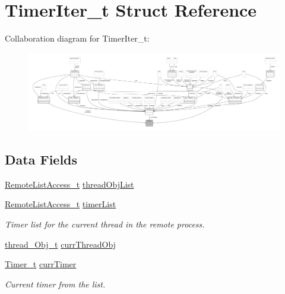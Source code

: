 \hypertarget{struct_timer_iter__t}{}\section{Timer\+Iter\+\_\+t Struct Reference}
\label{struct_timer_iter__t}


Collaboration diagram for Timer\+Iter\+\_\+t\+:
\nopagebreak
\begin{figure}[H]
\begin{center}
\leavevmode
\includegraphics[width=350pt]{struct_timer_iter__t__coll__graph}
\end{center}
\end{figure}
\subsection*{Data Fields}
\begin{DoxyCompactItemize}
\item 
\hyperlink{struct_remote_list_access__t}{Remote\+List\+Access\+\_\+t} \hyperlink{struct_timer_iter__t_a09fbd3cc7a330d57af9065ade9461254}{thread\+Obj\+List}
\item 
\hyperlink{struct_remote_list_access__t}{Remote\+List\+Access\+\_\+t} \hyperlink{struct_timer_iter__t_a9754504defe15f98c1b2fd6ca8e48b56}{timer\+List}
\begin{DoxyCompactList}\small\item\em Timer list for the current thread in the remote process. \end{DoxyCompactList}\item 
\hyperlink{structthread___obj__t}{thread\+\_\+\+Obj\+\_\+t} \hyperlink{struct_timer_iter__t_a369daa88ca59865b9cafb58710b8e028}{curr\+Thread\+Obj}
\item 
\hyperlink{struct_timer__t}{Timer\+\_\+t} \hyperlink{struct_timer_iter__t_af74ee30e948216dee2dc1da79df5ed5c}{curr\+Timer}
\begin{DoxyCompactList}\small\item\em Current timer from the list. \end{DoxyCompactList}\end{DoxyCompactItemize}


